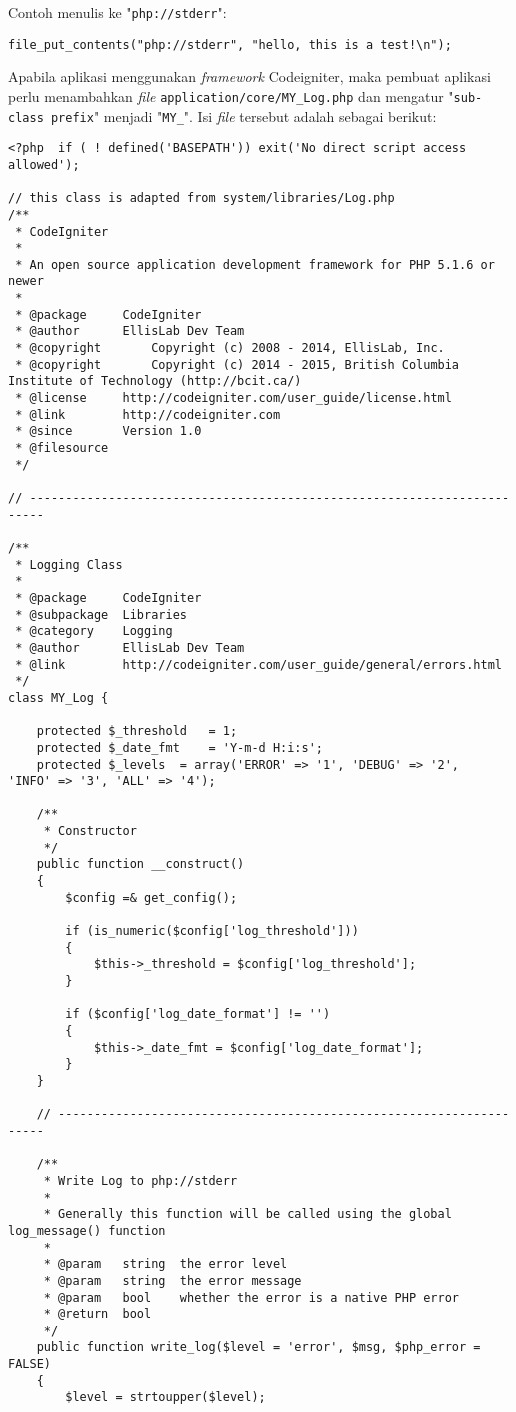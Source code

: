 Contoh menulis ke "\texttt{php://stderr}":
\begin{lstlisting}
file_put_contents("php://stderr", "hello, this is a test!\n");
\end{lstlisting}

Apabila aplikasi menggunakan \textit{framework} Codeigniter, maka pembuat aplikasi perlu menambahkan \textit{file} \texttt{application/core/MY\_Log.php} dan mengatur "\texttt{sub-class prefix}" menjadi "\texttt{MY\_}". Isi \textit{file} tersebut adalah sebagai berikut:

\begin{lstlisting}
<?php  if ( ! defined('BASEPATH')) exit('No direct script access allowed');

// this class is adapted from system/libraries/Log.php
/**
 * CodeIgniter
 *
 * An open source application development framework for PHP 5.1.6 or newer
 *
 * @package     CodeIgniter
 * @author      EllisLab Dev Team
 * @copyright       Copyright (c) 2008 - 2014, EllisLab, Inc.
 * @copyright       Copyright (c) 2014 - 2015, British Columbia Institute of Technology (http://bcit.ca/)
 * @license     http://codeigniter.com/user_guide/license.html
 * @link        http://codeigniter.com
 * @since       Version 1.0
 * @filesource
 */

// ------------------------------------------------------------------------

/**
 * Logging Class
 *
 * @package     CodeIgniter
 * @subpackage  Libraries
 * @category    Logging
 * @author      EllisLab Dev Team
 * @link        http://codeigniter.com/user_guide/general/errors.html
 */
class MY_Log {

    protected $_threshold   = 1;
    protected $_date_fmt    = 'Y-m-d H:i:s';
    protected $_levels  = array('ERROR' => '1', 'DEBUG' => '2',  'INFO' => '3', 'ALL' => '4');

    /**
     * Constructor
     */
    public function __construct()
    {
        $config =& get_config();

        if (is_numeric($config['log_threshold']))
        {
            $this->_threshold = $config['log_threshold'];
        }

        if ($config['log_date_format'] != '')
        {
            $this->_date_fmt = $config['log_date_format'];
        }
    }

    // --------------------------------------------------------------------

    /**
     * Write Log to php://stderr
     *
     * Generally this function will be called using the global log_message() function
     *
     * @param   string  the error level
     * @param   string  the error message
     * @param   bool    whether the error is a native PHP error
     * @return  bool
     */
    public function write_log($level = 'error', $msg, $php_error = FALSE)
    {
        $level = strtoupper($level);


\end{lstlisting}
